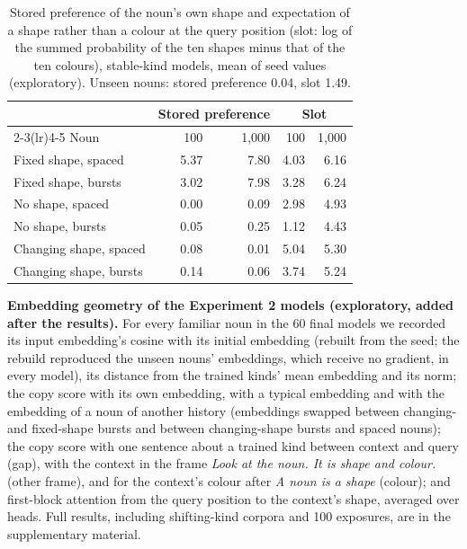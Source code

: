 \begin{table}[!htbp]
\centering\small
\caption{Stored preference of the noun's own shape and expectation of a shape rather than a colour at the query position (slot: log of the summed probability of the ten shapes minus that of the ten colours), stable-kind models, mean of seed values (exploratory). Unseen nouns: stored preference \textminus{}0.04, slot 1.49.}
\label{tab:N3}
\begin{tabular}{@{}lrrrr@{}}
\toprule
 & \multicolumn{2}{c}{Stored preference} & \multicolumn{2}{c}{Slot} \\ \cmidrule(lr){2-3}\cmidrule(lr){4-5}
Noun & 100 & 1,000 & 100 & 1,000 \\
\midrule
Fixed shape, spaced & 5.37 & 7.80 & 4.03 & 6.16 \\
Fixed shape, bursts & 3.02 & 7.98 & 3.28 & 6.24 \\
No shape, spaced & 0.00 & \textminus{}0.09 & \textminus{}2.98 & \textminus{}4.93 \\
No shape, bursts & 0.05 & \textminus{}0.25 & \textminus{}1.12 & \textminus{}4.43 \\
Changing shape, spaced & \textminus{}0.08 & 0.01 & 5.04 & 5.30 \\
Changing shape, bursts & 0.14 & 0.06 & 3.74 & 5.24 \\
\bottomrule
\end{tabular}
\end{table}





\textbf{Embedding geometry of the Experiment 2 models (exploratory, added after the results).} For every familiar noun in the 60 final models we recorded its input embedding's cosine with its initial embedding (rebuilt from the seed; the rebuild reproduced the unseen nouns' embeddings, which receive no gradient, in every model), its distance from the trained kinds' mean embedding and its norm; the copy score with its own embedding, with a typical embedding and with the embedding of a noun of another history (embeddings swapped between changing- and fixed-shape bursts and between changing-shape bursts and spaced nouns); the copy score with one sentence about a trained kind between context and query (gap), with the context in the frame \emph{Look at the \textit{noun}. It is \textit{shape} and \textit{colour}.} (other frame), and for the context's colour after \emph{A \textit{noun} is a \textit{shape}} (colour); and first-block attention from the query position to the context's shape, averaged over heads. Full results, including shifting-kind corpora and 100 exposures, are in the supplementary material.

